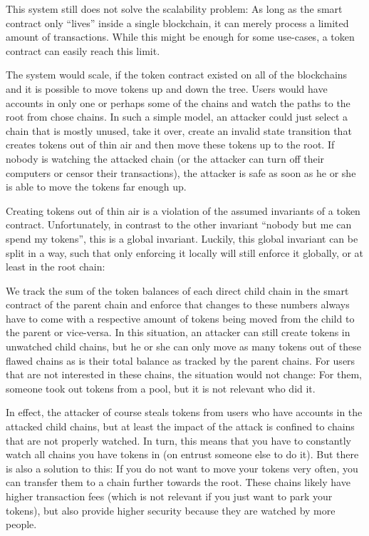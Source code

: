 \documentclass[letterpaper, 11pt]{article}
\begin{document}
This system still does not solve the scalability problem: As long as
the smart contract only ``lives'' inside a single blockchain, it can
merely process a limited amount of transactions. While this might be enough
for some use-cases, a token contract can easily reach this limit.

The system would scale, if the token contract existed on all of the blockchains
and it is possible to move tokens up and down the tree. Users would have accounts
in only one or perhaps some of the chains and watch the paths to the root
from chose chains. In such a simple model, an attacker could just select a
chain that is mostly unused, take it over, create an invalid state transition
that creates tokens out of thin air and then move these tokens up to the root.
If nobody is watching the attacked chain (or the attacker can turn off their
computers or censor their transactions), the attacker is safe as soon as he
or she is able to move the tokens far enough up.

Creating tokens out of thin air is a violation of the assumed invariants
of a token contract. Unfortunately, in contrast to the other invariant
``nobody but me can spend my tokens'', this is a global invariant.
Luckily, this global invariant can be split in a way, such that only enforcing
it locally will still enforce it globally, or at least in the root chain:

We track the sum of the token balances of each direct child chain in the smart
contract of the parent chain and enforce that changes to these numbers
always have to come with a respective amount of tokens being moved from
the child to the parent or vice-versa. In this situation, an attacker can still
create tokens in unwatched child chains, but he or she can only move as many tokens
out of these flawed chains as is their total balance as tracked by the parent chains.
For users that are not interested
in these chains, the situation would not change: For them, someone took out
tokens from a pool, but it is not relevant who did it.

In effect, the attacker of course steals tokens from users who have
accounts in the attacked child chains, but at least the impact of the attack is
confined to chains that are not properly watched. In turn, this means that you
have to constantly watch all chains you have tokens in (on entrust someone
else to do it). But there is also
a solution to this: If you do not
want to move your tokens very often, you can transfer them to a chain further
towards the root. These chains likely have higher transaction fees (which
is not relevant if you just want to park your tokens), but also
provide higher security because they are watched by more people.
	
\end{document}
